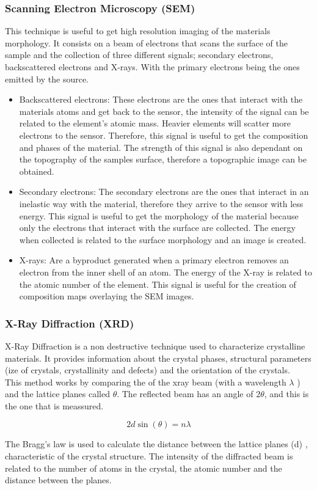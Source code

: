 \documentclass{article}
\begin{document}
\subsubsection{Scanning Electron Microscopy (SEM)}
This technique is useful to get high resolution imaging of the materials morphology.
It consists on a beam of electrons that scans the surface of the sample and the collection of three 
different signals; secondary electrons, backscattered electrons and X-rays. With the primary electrons 
being the ones emitted by the source.\\
\begin {itemize}
\item Backscattered electrons: These electrons are the ones that interact with the materials atoms and get back to
the sensor, the intensity of the signal can be related to the element's atomic mass. Heavier elements will scatter more electrons
to the sensor. Therefore, this signal is useful to get the composition and phases of the material.
The strength of this signal is also dependant on the topography of the samples surface, therefore a topographic image can be obtained.\\
\item Secondary electrons: The secondary electrons are the ones that interact in an inelastic way with the material, therefore they arrive to
the sensor with less energy. This signal is useful to get the morphology of the material because only the electrons that interact with the surface
are collected. The energy when collected is related to the surface morphology and an image is created.\\
\item X-rays: Are a byproduct generated when a primary electron removes an electron from the inner shell of an atom. The energy of the X-ray is related to the
atomic number of the element. This signal is useful for the creation of composition maps overlaying the 
SEM images.\\
\end{itemize}
\subsubsection{X-Ray Diffraction (XRD)}
X-Ray Diffraction is a non destructive technique used to characterize crystalline materials. 
It provides information about the crystal phases, structural parameters (ize of crystals, crystallinity  and defects) and the orientation of the crystals.\\
This method works by comparing the of the xray beam (with a wavelength $\lambda$ ) and the lattice planes called $\theta$. The reflected beam has an angle of $2\theta$, and this is the one that is meassured.
\begin{center}
  \[
      2d \sin(\theta) = n\lambda
  \]
\end{center}
The Bragg's law is used to calculate the distance between the lattice planes (d) , characteristic of the crystal structure. 
The intensity of the diffracted beam is related to the number of atoms in the crystal, the atomic number and the distance between the planes.\\
\end{document}
